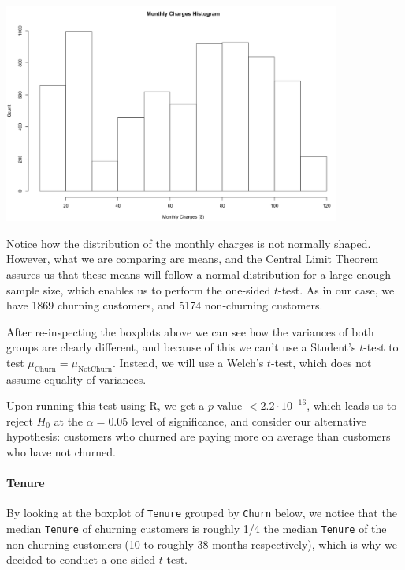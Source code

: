 \documentclass[man, floatsintext]{apa6}
\begin{document}
\noindent\begin{minipage}{0.54\textwidth}
\includegraphics[width = \linewidth, height = 72mm]{hist_MonthlyCharges}
\end{minipage}
\hfill
\begin{minipage}{0.43\textwidth} Notice how the distribution of the monthly charges is not normally shaped. However, what we are comparing are means, and the Central Limit Theorem assures us that these means will follow a normal distribution for a large enough sample size, which enables us to perform the one-sided $t$-test. As in our case, we have 1869 churning customers, and 5174 non-churning customers.
\end{minipage}

\hspace{0.5mm}

After re-inspecting the boxplots above we can see how the variances of both groups are clearly different, and because of this we can't use a Student's $t$-test to test $\mu_{\text{Churn}} = \mu_{\text{NotChurn}}$. Instead, we will use a Welch's $t$-test, which does not assume equality of variances.

Upon running this test using R, we get a $p$-value $< 2.2 \cdot 10^{-16}$, which leads us to reject $H_0$ at the  $\alpha = 0.05$ level of significance, and consider our alternative hypothesis: customers who churned are paying more on average than customers who have not churned.

\newpage

\paragraph{Tenure}

By looking at the boxplot of \texttt{Tenure} grouped by \texttt{Churn} below, we notice that the median \texttt{Tenure} of churning customers is roughly 1/4 the median \texttt{Tenure} of the non-churning customers (10 to roughly 38 months respectively), which is why we decided to conduct a one-sided $t$-test.
\end{document}
